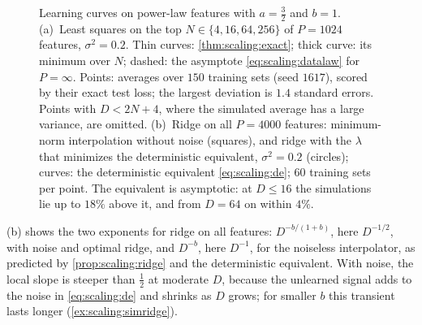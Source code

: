 \begin{refsection}
\begin{figure}[t]
\begin{fullwidth}
\caption{Learning curves on power-law features with $a=\frac32$ and $b=1$. (a)~Least squares on the top $N\in\{4,16,64,256\}$ of $P=1024$ features, $\sigma^2=0.2$. Thin curves: \cref{thm:scaling:exact}; thick curve: its minimum over $N$; dashed: the asymptote \eqref{eq:scaling:datalaw} for $P=\infty$. Points: averages over $150$ training sets (seed $1617$), scored by their exact test loss; the largest deviation is $1.4$ standard errors. Points with $D<2N+4$, where the simulated average has a large variance, are omitted. (b)~Ridge on all $P=4000$ features: minimum-norm interpolation without noise (squares), and ridge with the $\lambda$ that minimizes the deterministic equivalent, $\sigma^2=0.2$ (circles); curves: the deterministic equivalent \eqref{eq:scaling:de}; $60$ training sets per point. The equivalent is asymptotic: at $D\le16$ the simulations lie up to $18\%$ above it, and from $D=64$ on within $4\%$.}
\label{fig:scaling:curves}
\end{fullwidth}
\end{figure}

(b) shows the two exponents for ridge on all features: $D^{-b/(1+b)}$, here $D^{-1/2}$, with noise and optimal ridge, and $D^{-b}$, here $D^{-1}$, for the noiseless interpolator, as predicted by \cref{prop:scaling:ridge} and the deterministic equivalent. With noise, the local slope is steeper than $\frac12$ at moderate $D$, because the unlearned signal adds to the noise in \eqref{eq:scaling:de} and shrinks as $D$ grows; for smaller $b$ this transient lasts longer (\cref{ex:scaling:simridge}).


\end{refsection}
